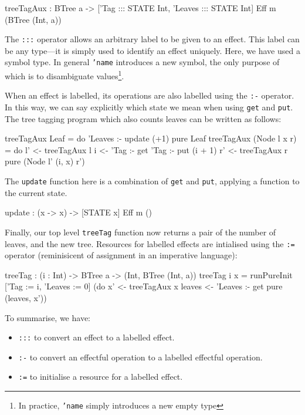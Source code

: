 \begin{code}
treeTagAux : BTree a -> { ['Tag ::: STATE Int,
                           'Leaves ::: STATE Int] } Eff m (BTree (Int, a))
\end{code}

\noindent
The \texttt{:::} operator allows an arbitrary label to be given to an effect.
This label can be any type---it is simply used to identify an effect uniquely.
Here, we have used a symbol type.
In general \texttt{'name} introduces a new symbol, the only purpose of which is to disambiguate values\footnote{In practice, \texttt{'name} simply introduces a new empty type}. 

When an effect is labelled, its operations are also labelled using the \texttt{:-} operator.
In this way, we can say explicitly which state we mean when using \texttt{get} and \texttt{put}.
The tree tagging program which also counts leaves can be written as follows:

\begin{code}
treeTagAux Leaf = do 'Leaves :- update (+1)
                     pure Leaf
treeTagAux (Node l x r)
  = do l' <- treeTagAux l
       i <- 'Tag :- get
       'Tag :- put (i + 1)
       r' <- treeTagAux r
       pure (Node l' (i, x) r')
\end{code}

\noindent
The \texttt{update} function here is a combination of \texttt{get} and \texttt{put}, applying a function to the current state.

\begin{code}
update : (x -> x) -> { [STATE x] } Eff m () 
\end{code}

\noindent
Finally, our top level \texttt{treeTag} function now returns a pair of the number of leaves, and the new tree.
Resources for labelled effects are intialised using the \texttt{:=} operator (reminisicent of assignment in an imperative language):

\begin{code}
treeTag : (i : Int) -> BTree a -> (Int, BTree (Int, a))
treeTag i x = runPureInit ['Tag := i, 'Leaves := 0]
                    (do x' <- treeTagAux x
                        leaves <- 'Leaves :- get
                        pure (leaves, x'))
\end{code}

\noindent
To summarise, we have:

\begin{itemize}
\item \texttt{:::} to convert an effect to a labelled effect.
\item \texttt{:-} to convert an effectful operation to a labelled effectful operation.
\item \texttt{:=} to initialise a resource for a labelled effect.
\end{itemize}

